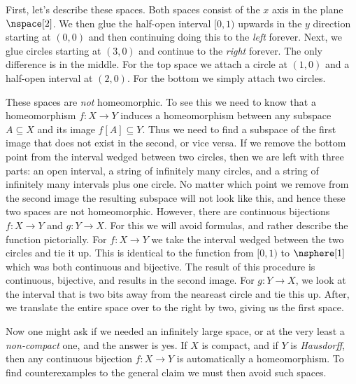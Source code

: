 \documentclass{book}                                                           %
\begin{document}
                First, let's describe these spaces. Both spaces consist of the
                $x$ axis in the plane $\nspace[2]$. We then glue the half-open
                interval $[0,1)$ upwards in the $y$ direction starting at
                $(0,0)$ and then continuing doing this to the \textit{left}
                forever. Next, we glue circles starting at $(3,0)$ and continue
                to the \textit{right} forever. The only difference is in the
                middle. For the top space we attach a circle at $(1,0)$ and a
                half-open interval at $(2,0)$. For the bottom we simply attach
                two circles.
                \par\hfill\par
                These spaces are \textit{not} homeomorphic. To see this we need
                to know that a homeomorphism $f:X\rightarrow{Y}$ induces a
                homeomorphism between any subspace $A\subseteq{X}$ and its image
                $f[A]\subseteq{Y}$. Thus we need to find a subspace of the first
                image that does not exist in the second, or vice versa. If we
                remove the bottom point from the interval wedged between two
                circles, then we are left with three parts: an open interval,
                a string of infinitely many circles, and a string of infinitely
                many intervals plus one circle. No matter which point we remove
                from the second image the resulting subspace will not look like
                this, and hence these two spaces are not homeomorphic. However,
                there are continuous bijections $f:X\rightarrow{Y}$ and
                $g:Y\rightarrow{X}$. For this we will avoid formulas, and rather
                describe the function pictorially. For $f:X\rightarrow{Y}$ we
                take the interval wedged between the two circles and tie it up.
                This is identical to the function from $[0,1)$ to $\nsphere[1]$
                which was both continuous and bijective. The result of this
                procedure is continuous, bijective, and results in the second
                image. For $g:Y\rightarrow{X}$, we look at the interval that is
                two bits away from the neareast circle and tie this up. After,
                we translate the entire space over to the right by two, giving
                us the first space.
                \par\hfill\par
                Now one might ask if we needed an infinitely large space, or at
                the very least a \textit{non-compact} one, and the answer is
                yes. If $X$ is compact, and if $Y$ is \textit{Hausdorff}, then
                any continuous bijection $f:X\rightarrow{Y}$ is automatically a
                homeomorphism. To find counterexamples to the general claim we
                must then avoid such spaces.
\end{document}
